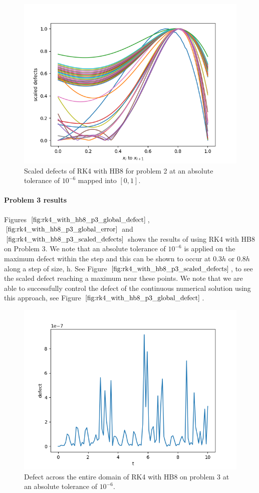 \begin{figure}[H]
\centering
\includegraphics[width=0.7\linewidth]{./figures/rk4_with_hb8_p2_scaled_defects}
\caption{Scaled defects of RK4 with HB8 for problem 2 at an absolute tolerance of $10^{-6}$ mapped into $[0, 1]$.}
\label{fig:rk4_with_hb8_p2_scaled_defects}
\end{figure}

\paragraph{Problem 3 results}
Figures $\ref{fig:rk4_with_hb8_p3_global_defect}$, $\ref{fig:rk4_with_hb8_p3_global_error}$ and $\ref{fig:rk4_with_hb8_p3_scaled_defects}$ shows the results of using RK4 with HB8 on Problem 3. 
We note that an absolute tolerance of $10^{-6}$ is applied on the maximum defect within the step and this can be shown to occur at $0.3h$ or $0.8h$ along a step of size, h.  See Figure $\ref{fig:rk4_with_hb8_p3_scaled_defects}$, to see the scaled defect reaching a maximum near these points. We note that we are able to successfully control the defect of the continuous numerical solution using this approach, see Figure $\ref{fig:rk4_with_hb8_p3_global_defect}$. 

\begin{figure}[H]
\centering
\includegraphics[width=0.7\linewidth]{./figures/rk4_with_hb8_p3_global_defect}
\caption{Defect across the entire domain of RK4 with HB8 on problem 3 at an absolute tolerance of $10^{-6}$.}
\label{fig:rk4_with_hb8_p3_global_defect}
\end{figure}


